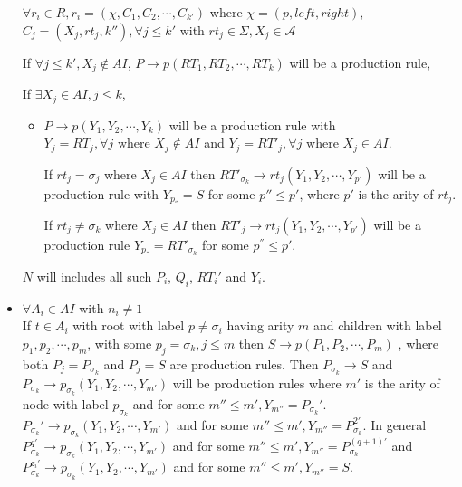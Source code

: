 \begin{itemize}
		$\forall r_i\in R, r_i=(\chi,C_1,C_2,\cdots ,C_{k'})$ where $\chi = (p,left,right)$, $C_j=(X_j,rt_j,k''), \forall j\leq k'$ with 
		$rt_j\in \Sigma , X_j\in \mathcal{A}$
	
		If $\forall j\leq k', X_j\notin AI$, \hbox{$P\rightarrow p(RT_1,RT_2,\cdots ,RT_k)$} will be a production rule, 

		If $\exists X_j\in AI,j\leq k$, 
			\begin{itemize}
			\item   $P\rightarrow p(Y_1,Y_2,\cdots ,Y_k)$ will be a production rule with 
				$Y_j=RT_j, \forall j \mbox{ where }X_j\notin AI$ and \hbox{$Y_j=RT'_j, \forall j \mbox{ where } X_j\in AI$.}


				If $rt_j=\sigma _j$ where $X_j\in AI$ then \hbox{$RT'_{\sigma _k}\rightarrow rt_j(Y_1,Y_2,\cdots ,Y_{p'})$} 
				will be a production rule with $ Y_{p_{''}}=S$ for some $p''\leq p'$, where $p'$ is the arity of $rt_j$.

				If $rt_j\neq \sigma _k$ where $X_j\in AI$ then \hbox{$RT'_j\rightarrow rt_j(Y_1,Y_2,\cdots ,Y_{p'})$} 
				will be a production rule  $Y_{p_{''}}=RT'_{\sigma _k}$ for some $p^{''}\leq p'$.

			\end{itemize}

		$N$ will includes all such $P_i$, $Q_i$, $RT_i'$ and $Y_i$.
	\item   $\forall A_i\in AI$ with $n_i\neq 1$\\
		If $t\in A_i$ with root with label  $p\neq \sigma _i$ having arity $m$ and children with label  $p_1,p_2,\cdots ,p_m$, 
		with some $p_j =\sigma _k,j\leq m$
		then  \hbox{$S\rightarrow p(P_1,P_2,\cdots ,P_m)$} , where both $P_j=P_{\sigma_k}$ and $P_j=S$ are production rules. Then 
		\hbox{$P_{\sigma_k}\rightarrow S$}  and \hbox{$P_{\sigma_k}\rightarrow p_{\sigma_k}(Y_1,Y_2,\cdots , Y_{m'})$} will be production rules 
		where $m'$ is the arity of node with label $p_{\sigma_k}$ and for some 
		$m''\leq m', Y_{m''}=P_{\sigma_k}'$. \hbox{$P_{\sigma_k}'\rightarrow p_{\sigma_k}(Y_1,Y_2,\cdots , Y_{m'})$} and for some
		$m''\leq m', Y_{m''}=P_{\sigma_k}^{2'}$. In general \hbox{$P_{\sigma_k}^{q'}\rightarrow p_{\sigma_k}(Y_1,Y_2,\cdots , Y_{m'})$} and for some
		$m''\leq m', Y_{m''}=P_{\sigma_k}^{(q+1)'}$ and  \hbox{$P_{\sigma_k}^{z_i'}\rightarrow p_{\sigma_k}(Y_1,Y_2,\cdots , Y_{m'})$}
		and for some $m''\leq m', Y_{m''}=S$.


\end{itemize}
